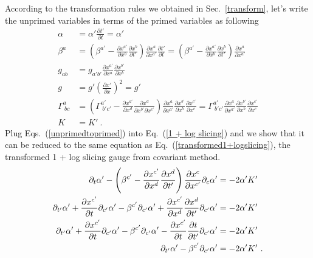 According to the transformation rules we obtained in Sec.~\ref{transform}, let's write the unprimed variables in terms of the primed variables as following
\begin{subequations}\label{unprimedtoprimed}
\begin{align}
\alpha & = \alpha'\frac{\partial t'}{\partial t} = \alpha'\\
\beta^{a} & = \left(\beta^{a'} - \frac{\partial x^{a'}}{\partial x^{b}}\frac{\partial x^{b}}{\partial t'}\right)\frac{\partial x^{a}}{\partial x^{a'}}\frac{\partial t'}{\partial t} =   \left(\beta^{a'} - \frac{\partial x^{a'}}{\partial x^{b}}\frac{\partial x^{b}}{\partial t'}\right)\frac{\partial x^{a}}{\partial x^{a'}}\\
g_{ab} & = g_{a'b'}\frac{\partial x^{a'}}{\partial x^{a}}\frac{\partial x^{b'}}{\partial x^{b}}\\
g & = g'\left(\frac{\partial x'}{\partial x}\right)^{2} = g'\\
\Gamma^{a}_{~bc} & = \left(\Gamma^{a'}_{~b'c'} - \frac{\partial x^{a'}}{\partial x^{d}}\frac{\partial x^{d}}{\partial x^{b'}\partial x^{c'}}\right)\frac{\partial x^{a}}{\partial x^{a'}}\frac{\partial x^{b'}}{\partial x^{b}}\frac{\partial x^{c'}}{\partial x^{c}} = \Gamma^{a'}_{~b'c'}\frac{\partial x^{a}}{\partial x^{a'}}\frac{\partial x^{b'}}{\partial x^{b}}\frac{\partial x^{c'}}{\partial x^{c}}\\
K & = K' \ .
\end{align}
\end{subequations}
Plug Eqs.~(\ref{unprimedtoprimed}) into Eq.~(\ref{1 + log slicing}) and we show that it can be reduced to the same equation as Eq.~(\ref{transformed1+logslicing}), the transformed 1 + log slicing gauge from covariant method. 
\begin{align}
\partial_{t}\alpha' - \left(\beta^{c'} - \frac{\partial x^{c'}}{\partial x^{d}}\frac{\partial x^{d}}{\partial t'}\right)\frac{\partial x^{c}}{\partial x^{c'}}\partial_{c}\alpha' & = -2\alpha' K'\notag\\
\partial_{t'}\alpha' + \frac{\partial x^{c'}}{\partial t}\partial_{c'}\alpha' - \beta^{c'}\partial_{c'}\alpha' + \frac{\partial x^{c'}}{\partial x^{d}}\frac{\partial x^{d}}{\partial t'}\partial_{c'}\alpha' & = -2\alpha' K'\notag\\
\partial_{t'}\alpha' + \frac{\partial x^{c'}}{\partial t}\partial_{c'}\alpha' - \beta^{c'}\partial_{c'}\alpha' - \frac{\partial x^{c'}}{\partial t}\frac{\partial t}{\partial t'}\partial_{c'}\alpha' & = -2\alpha' K'\notag\\
\partial_{t'}\alpha'  - \beta^{c'}\partial_{c'}\alpha' & = -2\alpha' K' \ .
\end{align}
